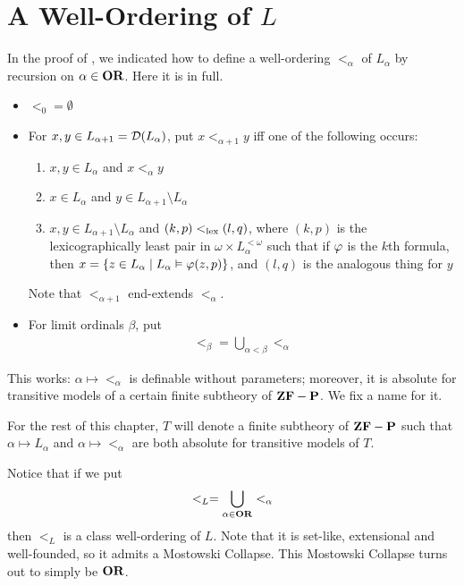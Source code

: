 \section{A Well-Ordering of $L$}

In the proof of , we indicated how to define a well-ordering $<_{\alpha}$ of $L_{\alpha}$ by recursion on $\alpha \in \mathbf{OR}$. Here it is in full.
\begin{itemize}
    \item $<_0 = \emptyset$
    \item For $x, y \in L_{\alpha + 1} = \mathcal{D}\!\left( L_{\alpha} \right)$, put $x <_{\alpha + 1} y$ iff one of the following occurs:
    \begin{enumerate}
        \item $x, y \in L_{\alpha}$ and $x <_{\alpha} y$
        \item $x \in L_{\alpha}$ and $y \in L_{\alpha + 1} \setminus L_{\alpha}$
        \item $x, y \in L_{\alpha + 1} \setminus L_{\alpha}$ and $(k, p) <_{\operatorname{lex}} (l, q)$, where $(k, p)$ is the lexicographically least pair in $\omega \times L_{\alpha}^{< \omega}$ such that if $\varphi$ is the $k$th formula, then $x = \left\{ z \in L_{\alpha} \; \middle\vert \; L_{\alpha} \vDash \varphi(z, p) \right\}$, and $(l, q)$ is the analogous thing for $y$
    \end{enumerate}
    Note that $<_{\alpha + 1}$ end-extends $<_{\alpha}$.

    \item For limit ordinals $\beta$, put
    \begin{align*}
        <_{\beta} = \bigcup_{\alpha < \beta} <_{\alpha}
    \end{align*}
\end{itemize}
This works: $\alpha \mapsto <_{\alpha}$ is definable without parameters; moreover, it is absolute for transitive models of a certain finite subtheory of $\mathbf{ZF} - \mathbf{P}$. We fix a name for it.

\begin{boxnotation}
    For the rest of this chapter, $T$ will denote a finite subtheory of $\mathbf{ZF} - \mathbf{P}$ such that $\alpha \mapsto L_{\alpha}$ and $\alpha \mapsto <_{\alpha}$ are both absolute for transitive models of $T$.
\end{boxnotation}

Notice that if we put
\begin{align*}
    <_{L} = \bigcup_{\alpha \in \mathbf{OR}} <_{\alpha}
\end{align*}
then $<_L$ is a class well-ordering of $L$. Note that it is set-like, extensional and well-founded, so it admits a Mostowski Collapse. This Mostowski Collapse turns out to simply be $\mathbf{OR}$.

